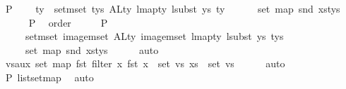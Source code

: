 \begin{isabellebody}
\ P{}{}{\isacharcolon}{\kern0pt}\isanewline
\ \ \ \ {\isachardoublequoteopen}{\isacharparenleft}{\kern0pt}{\isasymUnion}ty\ {\isasymin}\ set{\isacharunderscore}{\kern0pt}mset\ tys{\isachardot}{\kern0pt}\ {\isacharparenleft}{\kern0pt}ALty\ {\isacharparenleft}{\kern0pt}lmap{\isacharunderscore}{\kern0pt}ty\ {\isacharparenleft}{\kern0pt}lsubst\ ys{\isacharparenright}{\kern0pt}\ ty{\isacharparenright}{\kern0pt}{\isacharparenright}{\kern0pt}{\isacharparenright}{\kern0pt}\ {\isacharequal}{\kern0pt}\isanewline
\ \ \ \ \ set\ {\isacharparenleft}{\kern0pt}map\ snd\ xs{\isacharunderscore}{\kern0pt}tys{\isacharparenright}{\kern0pt}{\isachardoublequoteclose}\isanewline
\ \ \ \ \isamarkupfalse%
\ P{}{}\ \isamarkupfalse%
\ order\isanewline
\ \ \isamarkupfalse%
\ \isamarkupfalse%
\ P{}{}{\isacharcolon}{\kern0pt}\isanewline
\ \ \ \ {\isachardoublequoteopen}{\isasymUnion}\ {\isacharparenleft}{\kern0pt}set{\isacharunderscore}{\kern0pt}mset\ {\isacharparenleft}{\kern0pt}image{\isacharunderscore}{\kern0pt}mset\ ALty\ {\isacharparenleft}{\kern0pt}image{\isacharunderscore}{\kern0pt}mset\ {\isacharparenleft}{\kern0pt}lmap{\isacharunderscore}{\kern0pt}ty\ {\isacharparenleft}{\kern0pt}lsubst\ ys{\isacharparenright}{\kern0pt}{\isacharparenright}{\kern0pt}\ tys{\isacharparenright}{\kern0pt}{\isacharparenright}{\kern0pt}{\isacharparenright}{\kern0pt}\ {\isacharequal}{\kern0pt}\isanewline
\ \ \ \ \ set\ {\isacharparenleft}{\kern0pt}map\ snd\ xs{\isacharunderscore}{\kern0pt}tys{\isacharparenright}{\kern0pt}{\isachardoublequoteclose}\isanewline
\ \ \ \ \isamarkupfalse%
\ auto\isanewline
\isanewline
\ \ \isamarkupfalse%
\ vs{\isacharunderscore}{\kern0pt}aux{}{\isacharcolon}{\kern0pt}\ {\isachardoublequoteopen}set\ {\isacharparenleft}{\kern0pt}map\ fst\ {\isacharparenleft}{\kern0pt}{\isacharparenleft}{\kern0pt}filter\ {\isacharparenleft}{\kern0pt}{\isasymlambda}x{\isachardot}{\kern0pt}\ fst\ x\ {\isasymin}\ set\ vs{\isacharparenright}{\kern0pt}\ xs{\isacharparenright}{\kern0pt}{\isacharparenright}{\kern0pt}{\isacharparenright}{\kern0pt}\ {\isacharequal}{\kern0pt}\ set\ vs{\isachardoublequoteclose}\isanewline
\ \ \ \ \isamarkupfalse%
\ auto\isanewline
\ \ \ \ \isamarkupfalse%
\ P{}\ list{\isachardot}{\kern0pt}set{\isacharunderscore}{\kern0pt}map\ \isamarkupfalse%
\ auto\isanewline
\ \ \isamarkupfalse%

\end{isabellebody}
